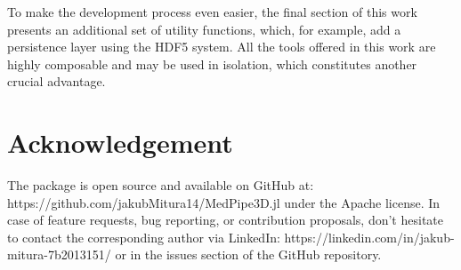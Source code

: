 \documentclass{juliacon}
\begin{document}
To make the development process even easier, the final section of this work presents an additional set of utility functions, which, for example, add a persistence layer  using the HDF5 system. All the tools offered in this work are highly composable and may be used in isolation, which constitutes another crucial advantage. 

\section{Acknowledgement}
The package is open source and available on GitHub at: https://github.com/jakubMitura14/MedPipe3D.jl under the Apache license. In case of feature requests, bug reporting, or contribution proposals, don't hesitate to contact the corresponding author via LinkedIn: https://linkedin.com/in/jakub-mitura-7b2013151/ or in the issues section of the GitHub repository.


\end{document}
